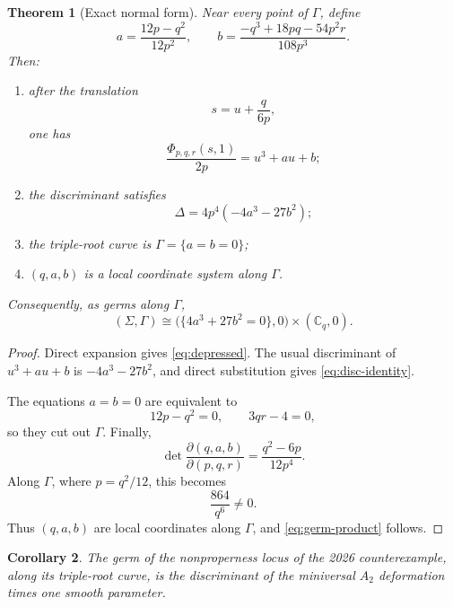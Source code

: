 \documentclass[11pt,reqno]{amsart}
\numberwithin{equation}{section}
\newtheorem{theorem}{Theorem}[section]
\newtheorem{corollary}[theorem]{Corollary}
\theoremstyle{remark}
\newcommand{\C}{\mathbb C}
\begin{document}
\begin{theorem}[Exact normal form]\label{thm:normal-form}
Near every point of $\Gamma$, define
\begin{equation}\label{eq:a-b}
a=\frac{12p-q^2}{12p^2},
\qquad
b=\frac{-q^3+18pq-54p^2r}{108p^3}.
\end{equation}
Then:
\begin{enumerate}[label=\textup{(\roman*)}]
\item after the translation
\[
s=u+\frac{q}{6p},
\]
one has
\begin{equation}\label{eq:depressed}
\frac{\Phi_{p,q,r}(s,1)}{2p}=u^3+au+b;
\end{equation}
\item the discriminant satisfies
\begin{equation}\label{eq:disc-identity}
\Delta=4p^4(-4a^3-27b^2);
\end{equation}
\item the triple-root curve is $\Gamma=\{a=b=0\}$;
\item $(q,a,b)$ is a local coordinate system along $\Gamma$.
\end{enumerate}
Consequently, as germs along $\Gamma$,
\begin{equation}\label{eq:germ-product}
(\Sigma,\Gamma)
\cong
\bigl(\{4a^3+27b^2=0\},0\bigr)\times(\C_q,0).
\end{equation}
\end{theorem}

\begin{proof}
Direct expansion gives \eqref{eq:depressed}. The usual discriminant of $u^3+au+b$ is $-4a^3-27b^2$, and direct substitution gives \eqref{eq:disc-identity}.

The equations $a=b=0$ are equivalent to
\[
12p-q^2=0,
\qquad
3qr-4=0,
\]
so they cut out $\Gamma$. Finally,
\begin{equation}\label{eq:coord-jac}
\det\frac{\partial(q,a,b)}{\partial(p,q,r)}
=
\frac{q^2-6p}{12p^4}.
\end{equation}
Along $\Gamma$, where $p=q^2/12$, this becomes
\[
\frac{864}{q^6}\neq0.
\]
Thus $(q,a,b)$ are local coordinates along $\Gamma$, and \eqref{eq:germ-product} follows.
\end{proof}

\begin{corollary}\label{cor:A2-nonproperness}
The germ of the nonproperness locus of the 2026 counterexample, along its triple-root curve, is the discriminant of the miniversal $A_2$ deformation times one smooth parameter.
\end{corollary}
\end{document}
